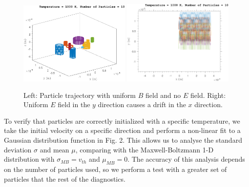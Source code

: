 \begin{figure}[h!]
  \centering
    \includegraphics[width=0.49\textwidth]{../Results/Lorentz_xyz_RK4_unifB_E0_10particles.pdf}
    \includegraphics[width=0.49\textwidth]{../Results/Lorentz_xy_RK4_unifB_E5_10particles.pdf}
    \label{test1}
  \caption{Left: Particle trajectory with uniform $B$ field and no $E$ field. Right: Uniform $E$ field in the $y$ direction causes a drift in the $x$ direction.}
\end{figure}

To verify that particles are correctly initialized with a specific temperature, we take the initial velocity on a specific direction and perform a non-linear fit to a Gaussian distribution function in Fig. 2. This allows us to analyse the standard deviation $\sigma$ and mean $\mu$, comparing with the Maxwell-Boltzmann 1-D distribution with $\sigma_{MB}=v_{th}$ and $\mu_{MB}=0$. The accuracy of this analysis depends on the number of particles used, so we perform a test with a greater set of particles that the rest of the diagnostics.

